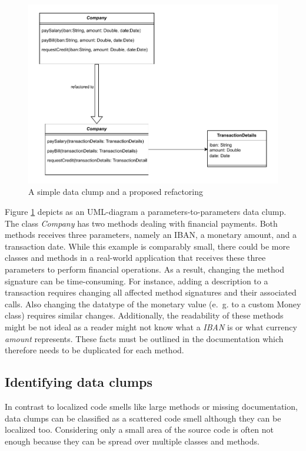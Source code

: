 \begin{figure}
    \centering
    \includegraphics[width=0.8\columnwidth]{figures/chapter2/dataClump/refactor_simple_case.pdf}
    \caption{A simple data clump and a proposed refactoring}
    \label{fig:company_bill_tax}
\end{figure}
Figure \ref{fig:company_bill_tax} depicts as an UML-diagram a parameters-to-parameters data clump. The class \textit{Company} has two methods dealing with financial payments. Both methods  receives three parameters, namely an IBAN, a monetary amount, and a transaction date. While this example is comparably small, there could be more classes and methods in a real-world application that receives these three parameters to perform financial operations. As a result, changing the method signature can be time-consuming. For instance, adding a description to a transaction requires changing all affected method signatures and their associated calls. Also changing the datatype of the monetary value (e.~g. to a custom Money class) requires similar changes. Additionally, the readability of these methods might be not ideal as a reader might not know what a \textit{IBAN} is or what currency \textit{amount} represents. These facts must be outlined in the documentation which therefore needs to be duplicated for each method. 
 
\subsection{Identifying data clumps}\label{sec:data_clump_detection}
In contrast to localized code smells like large methods or missing documentation, data clumps can be classified as a scattered code smell although they can be localized too. Considering only a small area of the source code is often not enough because they can be spread over multiple classes and methods. 

